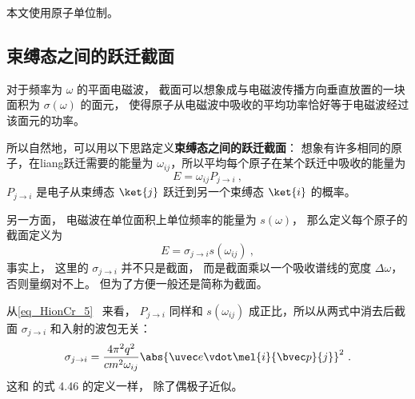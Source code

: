 
本文使用原子单位制。

\subsection{束缚态之间的跃迁截面}
对于频率为 $\omega$ 的平面电磁波， 截面可以想象成与电磁波传播方向垂直放置的一块面积为 $\sigma(\omega)$ 的面元， 使得原子从电磁波中吸收的平均功率恰好等于电磁波经过该面元的功率。

所以自然地，可以用以下思路定义\textbf{束缚态之间的跃迁截面}： 想象有许多相同的原子，在liang跃迁需要的能量为 $\omega_{ij}$，所以平均每个原子在某个跃迁中吸收的能量为
\begin{equation}
E = \omega_{ij}P_{j\to i}~,
\end{equation}
$P_{j\to i}$ 是电子从束缚态 $\ket{j}$ 跃迁到另一个束缚态 $\ket{i}$ 的概率。

另一方面， 电磁波在单位面积上单位频率的能量为 $s(\omega)$， 那么定义每个原子的截面定义为
\begin{equation}
E = \sigma_{j\to i} s(\omega_{ij})~,
\end{equation}
事实上， 这里的 $\sigma_{j\to i}$ 并不只是截面， 而是截面乘以一个吸收谱线的宽度 $\Delta \omega$， 否则量纲对不上。 但为了方便一般还是简称为截面。

从\autoref{eq_HionCr_5}~ 来看， $P_{j\to i}$ 同样和 $s(\omega_{ij})$ 成正比，所以从两式中消去后截面 $\sigma_{j\to i}$ 和入射的波包无关：
\begin{equation}
\sigma_{j\to i} = \frac{4\pi^2 q^2}{c m^2 \omega_{ij}} \abs{\uvec e \vdot\mel{i}{\bvec p}{j}}^2~.
\end{equation}
这和 \cite{Bransden} 的式 4.46 的定义一样， 除了偶极子近似。

